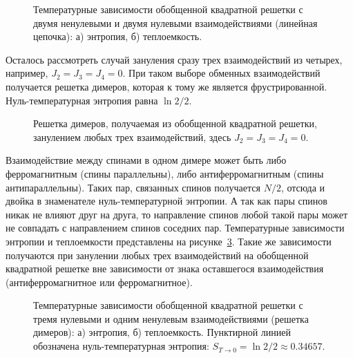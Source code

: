 \begin{figure}[h]
	\begin{minipage}[h]{0.5\linewidth}
	\end{minipage}
	\hfill
	\begin{minipage}[h]{0.5\linewidth}
	\end{minipage}
	\caption{Температурные зависимости обобщенной квадратной решетки с двумя ненулевыми и двумя нулевыми взаимодействиями (линейная цепочка): а) энтропия, б) теплоемкость.}
	\label{Linear}
\end{figure}

Осталось рассмотреть случай зануления сразу трех взаимодействий из четырех, например, $J_2 = J_3 = J_4 = 0$. При таком выборе обменных взаимодействий получается решетка димеров, которая к тому же является фрустрированной. Нуль-температурная энтропия равна $\ln 2/2$.

\begin{figure}[h]
	\caption{Решетка димеров, получаемая из обобщенной квадратной решетки, занулением любых трех взаимодействий, здесь $J_2 = J_3 = J_4 = 0$.}
	\label{dimerLattice}
\end{figure}

Взаимодействие между спинами в одном димере может быть либо ферромагнитным (спины параллельны), либо антиферромагнитным (спины антипараллельны). Таких пар, связанных спинов получается $N/2$, отсюда и двойка в знаменателе нуль-температурной энтропии. А так как пары спинов никак не влияют друг на друга, то направление спинов любой такой пары может не совпадать с направлением спинов соседних пар. Температурные зависимости энтропии и теплоемкости представлены на рисунке~\ref{Dimers}. Такие же зависимости получаются при занулении любых трех взаимодействий на обобщенной квадратной решетке вне зависимости от знака оставшегося взаимодействия (антиферромагнитное или ферромагнитное).

\begin{figure}[h]
	\begin{minipage}[h]{0.5\linewidth}
	\end{minipage}
	\hfill
	\begin{minipage}[h]{0.5\linewidth}
	\end{minipage}
	\caption{Температурные зависимости обобщенной квадратной решетки с тремя нулевыми и одним ненулевым взаимодействиями (решетка димеров): а) энтропия, б) теплоемкость. Пунктирной линией обозначена нуль-температурная энтропия: $S_{T\rightarrow 0} = \ln 2/2\approx 0.34657$.}
	\label{Dimers}
\end{figure}

